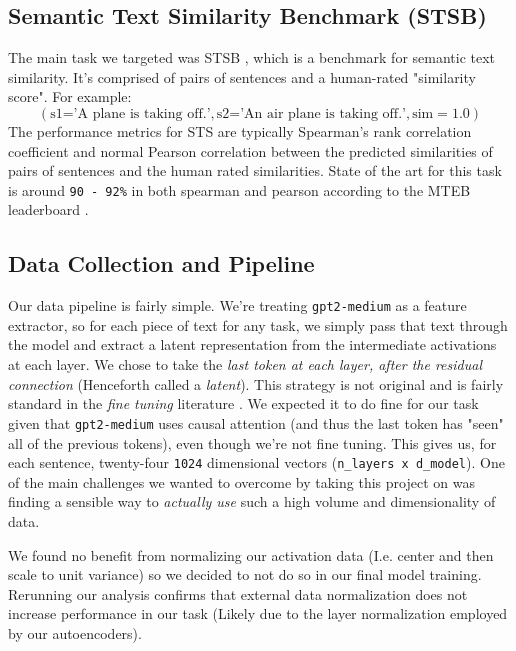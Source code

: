 \documentclass{article}
\begin{document}
\subsection{Semantic Text Similarity Benchmark (STSB)} \label{STS-section}
The main task we targeted was STSB \cite{STS}, which is a benchmark for semantic text similarity. It's comprised of pairs of sentences and a human-rated "similarity score". For example:
$$
(\text{s1='A plane is taking off.'}, \text{s2='An air plane is taking off.'}, \text{sim}=1.0)
$$
The performance metrics for STS are typically Spearman's rank correlation coefficient and normal Pearson correlation between the predicted similarities of pairs of sentences and the human rated similarities. State of the art for this task is around \verb|90 - 92%| in both spearman and pearson according to the MTEB leaderboard \cite{muennighoff2022mteb}.

\subsection{Data Collection and Pipeline} \label{latent}
Our data pipeline is fairly simple. We're treating \verb|gpt2-medium| as a feature extractor, so for each piece of text for any task, we simply pass that text through the model and extract a latent representation from the intermediate activations at each layer. We chose to take the \textit{last token at each layer, after the residual connection} (Henceforth called a \textit{latent}). This strategy is not original and is fairly standard in the \textit{fine tuning} literature \cite{LLMEmbed}. We expected it to do fine for our task given that \verb|gpt2-medium| uses causal attention (and thus the last token has "seen" all of the previous tokens), even though we're not fine tuning. This gives us, for each sentence, twenty-four \verb|1024| dimensional vectors (\verb|n_layers x d_model|). One of the main challenges we wanted to overcome by taking this project on was finding a sensible way to \textit{actually use} such a high volume and dimensionality of data.

We found no benefit from normalizing our activation data (I.e. center and then scale to unit variance) so we decided to not do so in our final model training. Rerunning our analysis confirms that external data normalization does not increase performance in our task (Likely due to the layer normalization employed by our autoencoders).

\end{document}
